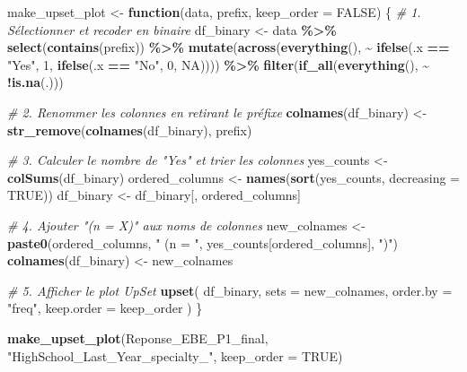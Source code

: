 \documentclass[
]{article}
\newenvironment{Shaded}{\begin{snugshade}}{\end{snugshade}}
\newcommand{\AttributeTok}[1]{\textcolor[rgb]{0.13,0.29,0.53}{#1}}
\newcommand{\CommentTok}[1]{\textcolor[rgb]{0.56,0.35,0.01}{\textit{#1}}}
\newcommand{\ConstantTok}[1]{\textcolor[rgb]{0.56,0.35,0.01}{#1}}
\newcommand{\ControlFlowTok}[1]{\textcolor[rgb]{0.13,0.29,0.53}{\textbf{#1}}}
\newcommand{\DecValTok}[1]{\textcolor[rgb]{0.00,0.00,0.81}{#1}}
\newcommand{\FunctionTok}[1]{\textcolor[rgb]{0.13,0.29,0.53}{\textbf{#1}}}
\newcommand{\NormalTok}[1]{#1}
\newcommand{\OtherTok}[1]{\textcolor[rgb]{0.56,0.35,0.01}{#1}}
\newcommand{\SpecialCharTok}[1]{\textcolor[rgb]{0.81,0.36,0.00}{\textbf{#1}}}
\newcommand{\StringTok}[1]{\textcolor[rgb]{0.31,0.60,0.02}{#1}}
\begin{document}
\begin{Shaded}
\begin{Highlighting}[]
\NormalTok{make\_upset\_plot }\OtherTok{\textless{}{-}} \ControlFlowTok{function}\NormalTok{(data, prefix, }\AttributeTok{keep\_order =} \ConstantTok{FALSE}\NormalTok{) \{}
  \CommentTok{\# 1. Sélectionner et recoder en binaire}
\NormalTok{  df\_binary }\OtherTok{\textless{}{-}}\NormalTok{ data }\SpecialCharTok{\%\textgreater{}\%}
    \FunctionTok{select}\NormalTok{(}\FunctionTok{contains}\NormalTok{(prefix)) }\SpecialCharTok{\%\textgreater{}\%}
    \FunctionTok{mutate}\NormalTok{(}\FunctionTok{across}\NormalTok{(}\FunctionTok{everything}\NormalTok{(), }\SpecialCharTok{\textasciitilde{}} \FunctionTok{ifelse}\NormalTok{(.x }\SpecialCharTok{==} \StringTok{"Yes"}\NormalTok{, }\DecValTok{1}\NormalTok{,}
                                         \FunctionTok{ifelse}\NormalTok{(.x }\SpecialCharTok{==} \StringTok{"No"}\NormalTok{, }\DecValTok{0}\NormalTok{, }\ConstantTok{NA}\NormalTok{)))) }\SpecialCharTok{\%\textgreater{}\%}
    \FunctionTok{filter}\NormalTok{(}\FunctionTok{if\_all}\NormalTok{(}\FunctionTok{everything}\NormalTok{(), }\SpecialCharTok{\textasciitilde{}} \SpecialCharTok{!}\FunctionTok{is.na}\NormalTok{(.)))}
  
  \CommentTok{\# 2. Renommer les colonnes en retirant le préfixe}
  \FunctionTok{colnames}\NormalTok{(df\_binary) }\OtherTok{\textless{}{-}} \FunctionTok{str\_remove}\NormalTok{(}\FunctionTok{colnames}\NormalTok{(df\_binary), prefix)}
  
  \CommentTok{\# 3. Calculer le nombre de "Yes" et trier les colonnes}
\NormalTok{  yes\_counts }\OtherTok{\textless{}{-}} \FunctionTok{colSums}\NormalTok{(df\_binary)}
\NormalTok{  ordered\_columns }\OtherTok{\textless{}{-}} \FunctionTok{names}\NormalTok{(}\FunctionTok{sort}\NormalTok{(yes\_counts, }\AttributeTok{decreasing =} \ConstantTok{TRUE}\NormalTok{))}
\NormalTok{  df\_binary }\OtherTok{\textless{}{-}}\NormalTok{ df\_binary[, ordered\_columns]}
  
  \CommentTok{\# 4. Ajouter "(n = X)" aux noms de colonnes}
\NormalTok{  new\_colnames }\OtherTok{\textless{}{-}} \FunctionTok{paste0}\NormalTok{(ordered\_columns, }\StringTok{" (n = "}\NormalTok{, yes\_counts[ordered\_columns], }\StringTok{")"}\NormalTok{)}
  \FunctionTok{colnames}\NormalTok{(df\_binary) }\OtherTok{\textless{}{-}}\NormalTok{ new\_colnames}
  
  \CommentTok{\# 5. Afficher le plot UpSet}
  \FunctionTok{upset}\NormalTok{(}
\NormalTok{    df\_binary,}
    \AttributeTok{sets =}\NormalTok{ new\_colnames,}
    \AttributeTok{order.by =} \StringTok{"freq"}\NormalTok{,}
    \AttributeTok{keep.order =}\NormalTok{ keep\_order}
\NormalTok{  )}
\NormalTok{\}}

\FunctionTok{make\_upset\_plot}\NormalTok{(Reponse\_EBE\_P1\_final, }\StringTok{"HighSchool\_Last\_Year\_specialty\_"}\NormalTok{, }\AttributeTok{keep\_order =} \ConstantTok{TRUE}\NormalTok{)}
\end{Highlighting}
\end{Shaded}
\end{document}
